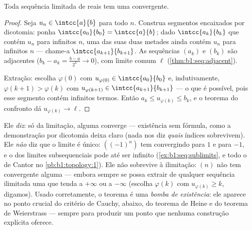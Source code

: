 \begin{theorem}\label{thm:b1:seq:bw}
Toda sequência limitada de reais tem uma 
convergente.
\end{theorem}

\begin{proof}
Seja $u_n \in \intcc{a}{b}$ para todo $n$. Construa segmentos encaixados por
dicotomia: ponha $\intcc{a_0}{b_0} = \intcc{a}{b}$; dado
$\intcc{a_k}{b_k}$ que contém $u_n$ para infinitos $n$, uma das
suas duas metades ainda contém $u_n$ para infinitos $n$ --- chame-a
$\intcc{a_{k+1}}{b_{k+1}}$. As sequências $(a_k)$ e $(b_k)$ são
adjacentes ($b_k - a_k = \frac{b-a}{2^k} \to 0$), com limite comum
$\ell$ (\cref{thm:b1:seq:adjacent}).

Extração: escolha $\varphi(0)$ com $u_{\varphi(0)} \in
\intcc{a_0}{b_0}$ e, indutivamente, $\varphi(k+1) > \varphi(k)$
com $u_{\varphi(k+1)} \in \intcc{a_{k+1}}{b_{k+1}}$ --- o que é possível,
pois esse segmento contém infinitos termos. Então $a_k \leq
u_{\varphi(k)} \leq b_k$, e o teorema do confronto dá
$u_{\varphi(k)} \to \ell$.
\end{proof}

\begin{remark}
Ele \emph{diz}: só da limitação, alguma 
converge --- existência sem fórmula, como a demonstração por dicotomia
deixa claro (nada nos diz \emph{quais} índices sobrevivem). Ele
\emph{não} diz que o limite é único: $((-1)^n)$ tem
 convergindo para $1$ e para $-1$, e o  dos
limites subsequenciais pode até ser infinito
(\cref{ex:b1:seq:sublimits}, e todo o  de Cantor no
\cref{pb:b1:topology:1}). Ele não sobrevive à ilimitação:
$(n)$ não tem  convergente alguma --- embora sempre se
possa extrair de qualquer sequência ilimitada uma  que
tenda a $+\infty$ ou a $-\infty$ (escolha $\varphi(k)$ com
$u_{\varphi(k)} \geq k$, digamos). Usado corretamente, o teorema é uma
\emph{bomba de existência}: ele aparece no ponto crucial do critério de
Cauchy, abaixo, do teorema de Heine e do teorema de Weierstrass ---
sempre para produzir um ponto que nenhuma construção explícita oferece.
\end{remark}

